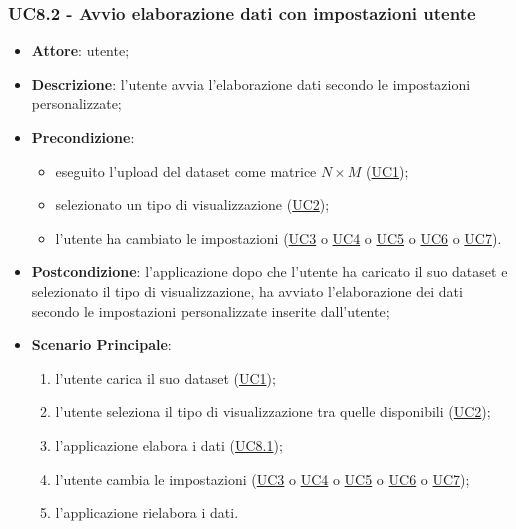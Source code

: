     \subsubsection{UC8.2 - Avvio elaborazione dati con impostazioni utente}
    \label{uc8.2}
    \begin{itemize}
    \item \textbf{Attore}: utente;
    \item \textbf{Descrizione}:  l'utente avvia l'elaborazione dati secondo le impostazioni personalizzate;
    \item \textbf{Precondizione}: 
    \begin{itemize}
        \item eseguito l'upload del dataset come matrice $N\times M$ (\hyperref[uc1]{UC1});
        \item selezionato un tipo di visualizzazione (\hyperref[uc2]{UC2});
        \item l'utente ha cambiato le impostazioni (\hyperref[uc3]{UC3} o \hyperref[uc4]{UC4} o \hyperref[uc5]{UC5} o \hyperref[uc6]{UC6} o \hyperref[uc7]{UC7}).
    \end{itemize}  
    \item \textbf{Postcondizione}: l'applicazione dopo che l'utente ha caricato il suo dataset e selezionato il tipo di visualizzazione, ha avviato l'elaborazione dei dati secondo le impostazioni personalizzate inserite dall'utente;
    \item \textbf{Scenario Principale}: 
    \begin{enumerate}
        \item l'utente carica il suo dataset (\hyperref[uc1]{UC1});
        \item l'utente seleziona il tipo di visualizzazione tra quelle disponibili (\hyperref[uc2]{UC2});
        \item l'applicazione elabora i dati (\hyperref[uc8.1]{UC8.1});
        \item l'utente cambia le impostazioni (\hyperref[uc3]{UC3} o \hyperref[uc4]{UC4} o \hyperref[uc5]{UC5} o \hyperref[uc6]{UC6} o \hyperref[uc7]{UC7});
        \item l'applicazione rielabora i dati.
    \end{enumerate}
    \end{itemize}
